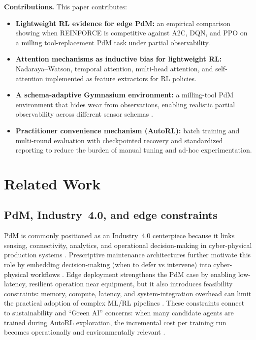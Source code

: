\documentclass[sn-basic]{sn-jnl} %
\begin{document}
\textbf{Contributions.}
This paper contributes:
\begin{itemize}
        \item \textbf{Lightweight RL evidence for edge PdM:} an empirical comparison showing when \textsc{REINFORCE} is competitive against \textsc{A2C}, \textsc{DQN}, and \textsc{PPO} on a milling tool-replacement PdM task under partial observability.
        \item \textbf{Attention mechanisms as inductive bias for lightweight RL:} Nadaraya--Watson, temporal attention, multi-head attention, and self-attention implemented as feature extractors for RL policies.
        \item \textbf{A schema-adaptive Gymnasium environment:} a milling-tool PdM environment that hides wear from observations, enabling realistic partial observability across different sensor schemas \cite{Foundation2023}.
        \item \textbf{Practitioner convenience mechanism (AutoRL):} batch training and multi-round evaluation with checkpointed recovery and standardized reporting to reduce the burden of manual tuning and ad-hoc experimentation.
\end{itemize}


\section{Related Work}
\subsection{PdM, Industry~4.0, and edge constraints}
PdM is commonly positioned as an Industry~4.0 centerpiece because it links sensing, connectivity, analytics, and operational decision-making in cyber-physical production systems \cite{Compare2020, Zonta2020}. Prescriptive maintenance architectures further motivate this role by embedding decision-making (when to defer vs intervene) into cyber-physical workflows \cite{Ansari2019}. Edge deployment strengthens the PdM case by enabling low-latency, resilient operation near equipment, but it also introduces feasibility constraints: memory, compute, latency, and system-integration overhead can limit the practical adoption of complex ML/RL pipelines \cite{Njor2024, Pandey2023}. These constraints connect to sustainability and ``Green AI'' concerns: when many candidate agents are trained during AutoRL exploration, the incremental cost per training run becomes operationally and environmentally relevant \cite{Schwartz2020, Strubell2019}.
\end{document}
